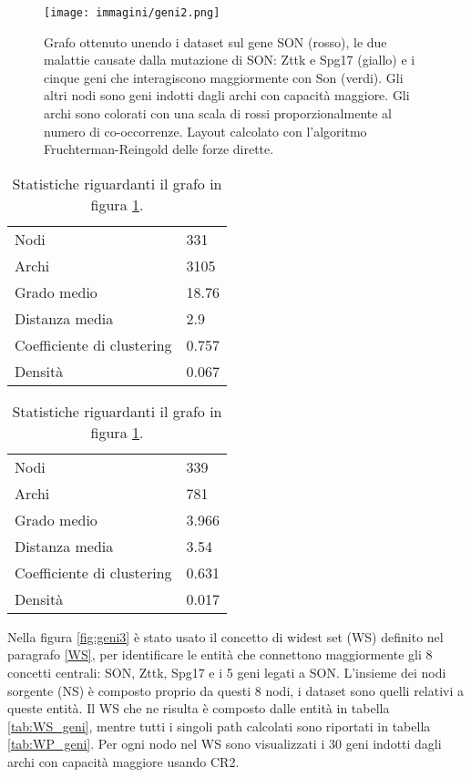 \documentclass[12pt]{report}
\begin{document}
\begin{figure}[!htb]
\centering
\texttt{[image: immagini/geni2.png]}
\caption{\footnotesize{Grafo ottenuto unendo i dataset sul gene SON (rosso), le due malattie causate dalla mutazione di SON: Zttk e Spg17 (giallo) e i cinque geni che interagiscono maggiormente con Son (verdi). Gli altri nodi sono geni indotti dagli archi con capacità maggiore. Gli archi sono colorati con una scala di rossi proporzionalmente al numero di co-occorrenze. Layout calcolato con l'algoritmo Fruchterman-Reingold delle forze dirette.}}
\label{fig:geni2}
\end{figure}


\begin{table}[htb]
\parbox{.4\linewidth}{
\centering
\begin{tabular}{|l|l|}
    \hline
    \small{Nodi} & \small{331}	\\
    \small{Archi} &	\small{3105}\\
    \small{Grado medio} & \small{18.76} 	\\
    \small{Distanza media} & \small{2.9}	\\
    \small{Coefficiente di clustering} & \small{0.757}	\\
    \small{Densità} &	\small{0.067}\\
    \hline
\end{tabular}
\caption{\footnotesize{Statistiche riguardanti il grafo in figura \ref{fig:geni}.}}
\label{tab:geni_stat}
}
\hfill
\parbox{.4\linewidth}{
\centering
\begin{tabular}{|l|l|}
    \hline
    \small{Nodi} & \small{339}	\\
    \small{Archi} &	\small{781}\\
    \small{Grado medio} & \small{3.966} 	\\
    \small{Distanza media} & \small{3.54}	\\
    \small{Coefficiente di clustering} & \small{0.631}	\\
    \small{Densità} &	\small{0.017}\\
    \hline
\end{tabular}
\caption{\footnotesize{Statistiche riguardanti il grafo in figura \ref{fig:geni2}.}}
\label{tab:geni2_stat}
}
\end{table}

Nella figura \ref{fig:geni3} è stato usato il concetto di widest set (WS) definito nel paragrafo \ref{WS}, per identificare le entità che connettono maggiormente gli 8 concetti centrali: SON, Zttk, Spg17 e i 5 geni legati a SON. L'insieme dei nodi sorgente (NS) è composto proprio da questi 8 nodi, i dataset sono quelli relativi a queste entità. Il WS che ne risulta è composto dalle entità in tabella \ref{tab:WS_geni}, mentre tutti i singoli path calcolati sono riportati in tabella \ref{tab:WP_geni}. Per ogni nodo nel WS sono visualizzati i 30 geni indotti dagli archi con capacità maggiore usando CR2.
\end{document}
